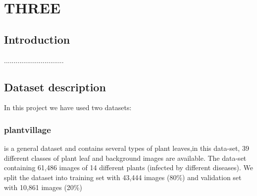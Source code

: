 \let\textcircled=\pgftextcircled
\chapter{THREE}
\label{chap:intro}
\section{Introduction}...............................
\section{Dataset description}
\label{Dataset description}
In this project we have used two datasets: 
\subsection{plantvillage} is a general dataset and contains several types of plant leaves,in this data-set, 39 different classes of plant leaf and background images are available. The data-set containing 61,486 images
of 14 different plants (infected by different diseases). We split
the dataset into training set with 43,444 images (80\%) and
validation set with 10,861 images (20\%)
